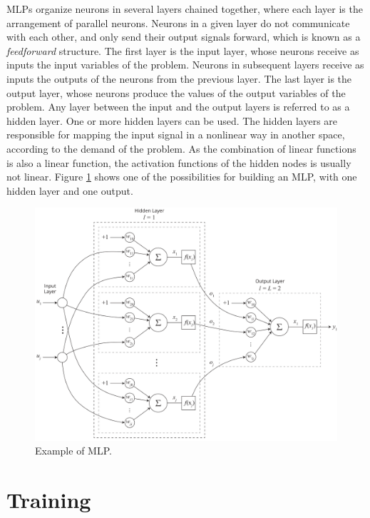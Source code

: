 MLPs organize neurons in several layers chained together, where each layer is the arrangement of parallel neurons. Neurons in a given layer do not communicate with each other, and only send their output signals forward, which is known as a \textit{feedforward} structure. The first layer is the input layer, whose neurons receive as inputs the input variables of the problem. Neurons in subsequent layers receive as inputs the outputs of the neurons from the previous layer. The last layer is the output layer, whose neurons produce the values of the output variables of the problem. Any layer between the input and the output layers is referred to as a hidden layer. One or more hidden layers can be used.  The hidden layers are responsible for mapping the input signal in a nonlinear way in another space, according to the demand of the problem. As the combination of linear functions is also a linear function, the activation functions of the hidden nodes is usually not linear.
Figure \ref{fig:mlp} shows one of the possibilities for building an MLP, with one hidden layer and one output.

\begin{figure}[h!]
    \centering
    \includegraphics[width=1\textwidth]{"Part 3 - Learning Systems/Supervised Learning/Multilayer Perceptron/MLP.png"}
    \caption{Example of MLP.}
    \label{fig:mlp}
\end{figure}

\section{Training}
\label{ssec:treino}


